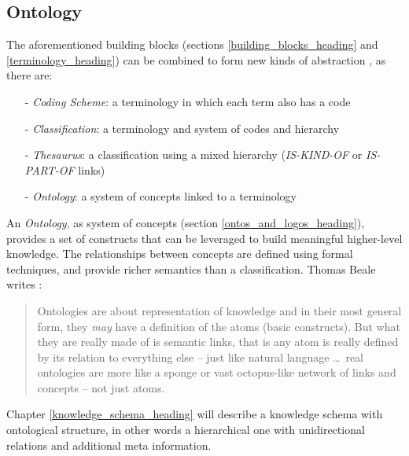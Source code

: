 %
%
%
%
%
%
%

\subsection{Ontology}
\label{ontology_heading}

The aforementioned building blocks (sections \ref{building_blocks_heading} and
\ref{terminology_heading}) can be combined to form new kinds of abstraction
\cite{rogers}, as there are:

\begin{itemize}
    \item[-] \emph{Coding Scheme}: a terminology in which each term also has a code
    \item[-] \emph{Classification}: a terminology and system of codes and hierarchy
    \item[-] \emph{Thesaurus}: a classification using a mixed hierarchy
        (\emph{IS-KIND-OF} or \emph{IS-PART-OF} links)
    \item[-] \emph{Ontology}: a system of concepts linked to a terminology
\end{itemize}

An \emph{Ontology}, as system of concepts (section
\ref{ontos_and_logos_heading}), provides a set of constructs that can be
leveraged to build meaningful higher-level knowledge. The relationships between
concepts are defined using formal techniques, and provide richer semantics than
a classification. Thomas Beale writes \cite{openehrtechnical}:

\begin{quote}
    Ontologies are about representation of knowledge and in their most general
    form, they \emph{may} have a definition of the atoms (basic constructs).
    But what they are really made of is semantic links, that is any atom is
    really defined by its relation to everything else -- just like natural
    language \ldots\ real ontologies are more like a sponge or vast
    octopus-like network of links and concepts -- not just atoms.
\end{quote}

Chapter \ref{knowledge_schema_heading} will describe a knowledge schema with
ontological structure, in other words a hierarchical one with unidirectional
relations and additional meta information.
